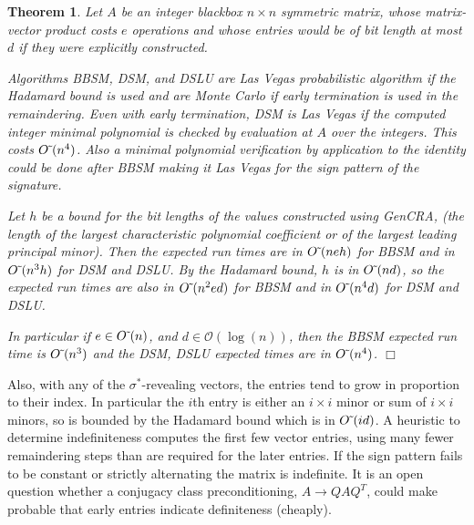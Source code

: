 \documentclass{acm_proc_article-sp}
\def\bO{\mathcal O}
\newcommand{\softO}{{O\mskip1mu\tilde{\,}\mskip1mu}}
\newcommand{\QED}{\ensuremath{\Box}}
\newcommand{\signature}{\ensuremath{\sigma^{*}}}
\newcommand{\n}{\ensuremath{n}}
\newtheorem{theorem}{Theorem}
\begin{document}
\begin{theorem}
Let $A$ be an integer blackbox $\n \times n$ symmetric matrix,
whose matrix-vector product costs $e$ operations and 
whose entries would be of bit length at most $d$ if they were explicitly constructed.

Algorithms BBSM, DSM, and DSLU are Las Vegas probabilistic algorithm 
if the Hadamard bound is used and are
Monte Carlo if early termination is used in the remaindering.
Even with early termination, DSM is Las Vegas if the computed 
integer minimal polynomial is checked by evaluation at $A$ over the integers. 
This costs $\softO(n^4)$.%
Also a minimal polynomial verification by application to the identity 
could be done after
BBSM making it Las Vegas for the sign pattern of the signature.

Let $h$ be a bound for the bit lengths of the values constructed using GenCRA, 
(the length of the largest characteristic polynomial coefficient or of the 
largest leading principal minor).  Then the expected run times are in 
$\softO(neh)$ for BBSM and in $\softO(n^3h)$  for DSM and DSLU.
By the Hadamard bound, $h$ is in $\softO(nd)$, so the expected run times
are also in $\softO(n^2 e d)$ for BBSM and in 
$\softO(n^4d)$ for DSM and DSLU.

In particular if $e \in \softO(n)$, and $d \in \bO(\log(n))$,
then the BBSM expected run time is $\softO(n^3)$ and the DSM, DSLU expected times are in $\softO(n^4)$.
\QED
\end{theorem}

Also, with any of the \signature-revealing vectors, the entries tend to grow 
in proportion to their index.  In particular the $i$th entry is either an $i\times i$
minor or sum of $i\times i$ minors, so is bounded by the Hadamard bound which is in $\softO(id)$.
A heuristic to determine indefiniteness 
computes the first few vector entries, using many fewer remaindering steps than are required
for the later entries.  If the sign pattern fails to be constant or strictly alternating
the matrix is indefinite.  It is an open question whether a conjugacy class preconditioning,
$A \rightarrow QAQ^T$, could make probable that early entries indicate definiteness (cheaply).

%
\end{document}
